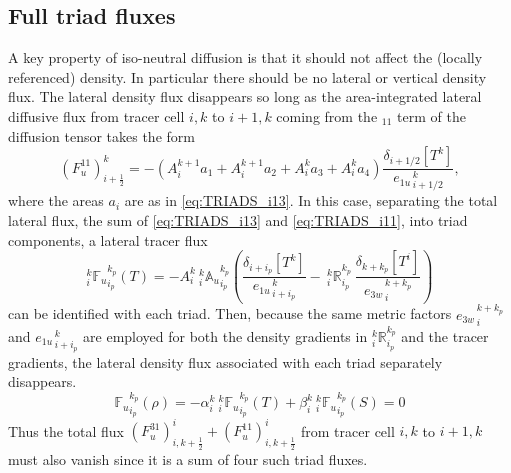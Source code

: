 \documentclass[../main/NEMO_manual]{subfiles}
\begin{document}
\subsection{Full triad fluxes}

A key property of iso-neutral diffusion is that it should not affect the (locally referenced) density.
In particular there should be no lateral or vertical density flux.
The lateral density flux disappears so long as the area-integrated lateral diffusive flux from
tracer cell $i,k$ to $i+1,k$ coming from the $_{11}$ term of the diffusion tensor takes the form
\begin{equation}
  \label{eq:TRIADS_i11}
  \left( F_u^{11} \right) _{i+\frac{1}{2}} ^{k} =
  - \left( {A}_i^{k+1} a_{1} + {A}_i^{k+1} a_{2} + {A}_i^k
    a_{3} + {A}_i^k a_{4} \right)
  \frac{\delta_{i+1/2} \left[ T^k\right]}{{e_{1u}}_{\,i+1/2}^{\,k}},
\end{equation}
where the areas $a_i$ are as in \autoref{eq:TRIADS_i13}.
In this case, separating the total lateral flux, the sum of \autoref{eq:TRIADS_i13} and \autoref{eq:TRIADS_i11},
into triad components, a lateral tracer flux
\begin{equation}
  \label{eq:TRIADS_latflux-triad}
  _i^k {\mathbb{F}_u}_{i_p}^{k_p} (T) = - {A}_i^k{ \:}_i^k{\mathbb{A}_u}_{i_p}^{k_p}
  \left(
    \frac{ \delta_{i+ i_p}[T^k] }{ {e_{1u}}_{\,i + i_p}^{\,k} }
    -\ {_i^k\mathbb{R}_{i_p}^{k_p}} \
    \frac{ \delta_{k+k_p} [T^i] }{{e_{3w}}_{\,i}^{\,k+k_p} }
  \right)
\end{equation}
can be identified with each triad.
Then, because the same metric factors ${e_{3w}}_{\,i}^{\,k+k_p}$ and ${e_{1u}}_{\,i+i_p}^{\,k}$ are employed for both
the density gradients in $ _i^k \mathbb{R}_{i_p}^{k_p}$ and the tracer gradients,
the lateral density flux associated with each triad separately disappears.
\begin{equation}
  \label{eq:TRIADS_latflux-rho}
  {\mathbb{F}_u}_{i_p}^{k_p} (\rho)=-\alpha _i^k {\:}_i^k {\mathbb{F}_u}_{i_p}^{k_p} (T) + \beta_i^k {\:}_i^k {\mathbb{F}_u}_{i_p}^{k_p} (S)=0
\end{equation}
Thus the total flux $\left( F_u^{31} \right) ^i _{i,k+\frac{1}{2}} + \left( F_u^{11} \right) ^i _{i,k+\frac{1}{2}}$ from
tracer cell $i,k$ to $i+1,k$ must also vanish since it is a sum of four such triad fluxes.
\end{document}
